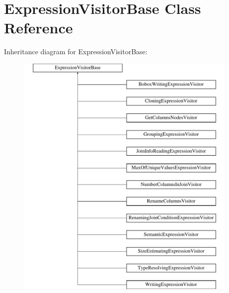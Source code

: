 \hypertarget{class_expression_visitor_base}{\section{Expression\+Visitor\+Base Class Reference}
\label{class_expression_visitor_base}
}
Inheritance diagram for Expression\+Visitor\+Base\+:\begin{figure}[H]
\begin{center}
\leavevmode
\includegraphics[height=12.000000cm]{class_expression_visitor_base}
\end{center}
\end{figure}
